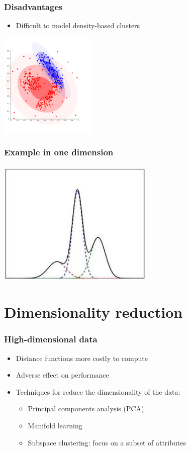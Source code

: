 \documentclass[10pt]{beamer}
\begin{document}
\begin{frame}
  \frametitle{Disadvantages}
  \begin{itemize}
    \item Difficult to model density-based clusters
  \end{itemize}
  \centerline{\includegraphics[height=5cm]{images/density.png}}
\end{frame}

\begin{frame}
  \frametitle{Example in one dimension}
  \centerline{\includegraphics[height=6cm]{images/gaussian.jpg}}
\end{frame}

\section{Dimensionality reduction}

\begin{frame}
  \frametitle{High-dimensional data}
  \begin{itemize}
	\item Distance functions more costly to compute
	\item Adverse effect on performance
	\item Techniques for reduce the dimensionality of the data:
  \begin{itemize}
	\item Principal components analysis (PCA)
	\item Manifold learning
	\item Subspace clustering: focus on a subset of attributes
  \end{itemize}
  \end{itemize}
\end{frame}
\end{document}
